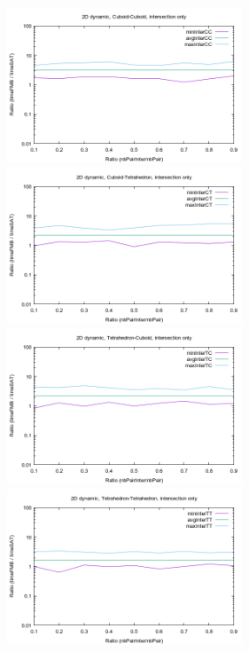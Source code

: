 \documentclass[12pt, a4paper]{article}
\begin{document}
\begin{center}
\begin{figure}[H]
\centering\includegraphics[width=7cm]{../Results/qualification2DTimeCCinter.png}
\centering\includegraphics[width=7cm]{../Results/qualification2DTimeCTinter.png}
\centering\includegraphics[width=7cm]{../Results/qualification2DTimeTCinter.png}
\centering\includegraphics[width=7cm]{../Results/qualification2DTimeTTinter.png}
\end{figure}
\end{center}
\end{document}

